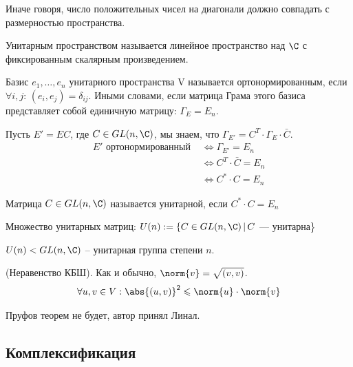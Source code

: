 Иначе говоря, число положительных чисел на диагонали должно совпадать с размерностью пространства. 

\begin{conj}
    Унитарным пространством называется линейное пространство над $\C$ с фиксированным скалярным произведением.
\end{conj}

\begin{conj}
    Базис $e_1, \dots, e_n$ унитарного пространства V называется ортонормированным,
    если $\forall i, j: \, (e_i, e_j) = \delta_{ij}$. Иными словами, если матрица Грама этого базиса представляет собой единичную матрицу: 
    $\Gamma_E = E_n$. 
\end{conj}

Пусть $E' = EC$, где $C \in GL(n, \C)$, мы знаем, что $\Gamma_{E'} = C^T \cdot \Gamma_E \cdot \bar{C}$. 
\begin{align*}
    E' \text{ ортонормированный } &\Longleftrightarrow \Gamma_{E'} = E_n \\
    &\Longleftrightarrow C^T \cdot \bar{C} = E_n \\
    &\Longleftrightarrow C^* \cdot C = E_n
\end{align*}

\begin{conj}
    Матрица $C \in GL(n, \C)$ называется унитарной, если $C^* \cdot C = E_n$
\end{conj}

\begin{conj}
    Множество унитарных матриц: $U(n) := \{ C \in GL(n, \C) \, | \, C$ --- унитарна\}
\end{conj}

\begin{theorem}
    $U(n) < GL(n, \C)$ -- унитарная группа степени $n$.
\end{theorem}

\begin{theorem} (Неравенство КБШ). Как и обычно, $\norm{v} = \sqrt{(v, v)}$. 
    \begin{gather*}
        \forall u,v \in V: \abs{(u, v)}^2 \leqslant \norm{u} \cdot \norm{v}
    \end{gather*}
\end{theorem}
Пруфов теорем не будет, автор принял Линал. 

\subsection{Комплексификация}

